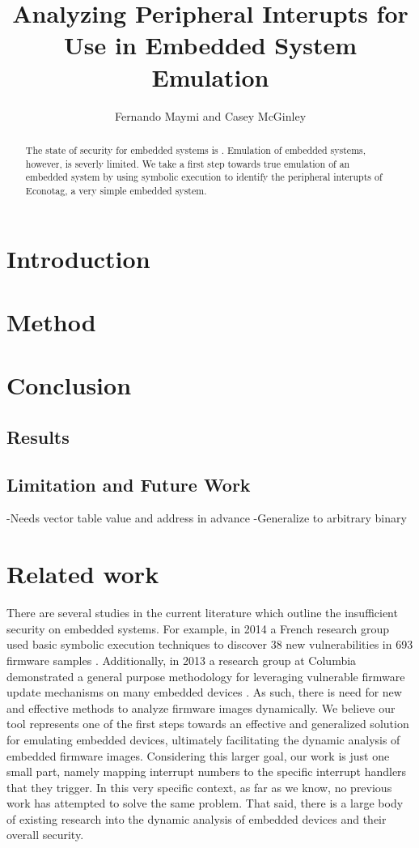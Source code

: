 \documentclass[letterpaper, 10 pt, conference]{ieeeconf}
\title{\LARGE \bf
Analyzing Peripheral Interupts for Use in Embedded System Emulation
}
\author{Fernando Maymi and Casey McGinley}
\begin{document}
\maketitle
\thispagestyle{empty}
\pagestyle{empty}

\begin{abstract}
The state of security for embedded systems is . Emulation of embedded systems, however, is severly limited. We take a first step towards true emulation of an embedded system by using symbolic execution to identify the peripheral interupts of Econotag, a very simple embedded system.
\end{abstract}

\section{Introduction}


\section{Method}

\section{Conclusion}
\subsection{Results}
\subsection{Limitation and Future Work}
-Needs vector table value and address in advance
-Generalize to arbitrary binary

\section{Related work}
There are several studies in the current literature which outline the insufficient security on embedded systems. For example, in 2014 a French research group used basic symbolic execution techniques to discover 38 new vulnerabilities in 693 firmware samples \cite{acostin}. Additionally, in 2013 a research group at Columbia demonstrated a general purpose methodology for leveraging vulnerable firmware update mechanisms on many embedded devices \cite{acui}. As such, there is need for new and effective methods to analyze firmware images dynamically. We believe our tool represents one of the first steps towards an effective and generalized solution for emulating embedded devices, ultimately facilitating the dynamic analysis of embedded firmware images. Considering this larger goal, our work is just one small part, namely mapping interrupt numbers to the specific interrupt handlers that they trigger. In this very specific context, as far as we know, no previous work has attempted to solve the same problem. That said, there is a large body of existing research into the dynamic analysis of embedded devices and their overall security.
\end{document}
